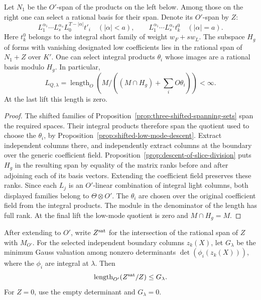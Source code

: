 \begin{established}\label{hyp:slice-product-lattices}
Let \(N_1\) be the \(O'\)-span of the products on the left below.
Among those on the right one can select a rational basis for their
span. Denote its \(O'\)-span by \(Z\):
\[
 L_1^{\alpha_1}\cdots L_s^{\alpha_s}L_0^{T-|\alpha|}t'_i
 \quad(|\alpha|<a),\qquad
 L_1^{\alpha_1}\cdots L_s^{\alpha_s}t_k^0
 \quad(|\alpha|=a).
\]
Here \(t_k^0\) belongs to the integral short family of weight
\(w_F+s w_L\). The subspace \(H_g\) of forms with vanishing designated
low coefficients lies in the rational span of \(N_1+Z\) over \(K'\).
One can select integral products \(\theta_i\) whose images are a
rational basis modulo \(H_g\). In particular,
\[
 L_{Q,\lambda}
 =\operatorname{length}_{O}\left(
 M/\left((M\cap H_g)+\textstyle\sum_i O\theta_i\right)\right)<\infty .
\]
At the last lift this length is zero.
\end{established}
\begin{proof}
The shifted families of Proposition~\ref{prop:three-shifted-spanning-sets}
span the required spaces. Their integral products therefore span the
quotient used to choose the \(\theta_i\), by
Proposition~\ref{prop:shifted-low-mode-descent}. Extract independent columns
there, and independently extract columns at the boundary over the generic
coefficient field. Proposition~\ref{prop:descent-of-slice-division} puts
\(H_g\) in the resulting span by equality of the matrix ranks before and
after adjoining each of its basis vectors. Extending the coefficient
field preserves these ranks. Since each \(L_j\) is an \(O'\)-linear
combination of integral light columns, both displayed families belong
to \(\Theta\otimes O'\). The \(\theta_i\) are chosen over the original
coefficient field from the integral products. The module in the
denominator of the length has full rank. At the final lift the low-mode
quotient is zero and \(M\cap H_g=M\).
\end{proof}

\begin{lemma}\label{lem:slice-boundary-saturation}
After extending to \(O'\), write \(Z^{\rm sat}\) for the
intersection of the rational span of \(Z\) with \(M_{O'}\).
For the selected independent boundary columns \(z_k(X)\),
let \(G_\lambda\) be the minimum Gauss valuation among nonzero
determinants \(\det(\phi_i(z_k(X)))\), where the \(\phi_i\)
are integral at \(\lambda\). Then
\[
          \operatorname{length}_{O'}(Z^{\rm sat}/Z)\le G_\lambda .
\]
For \(Z=0\), use the empty determinant and \(G_\lambda=0\).
\end{lemma}

